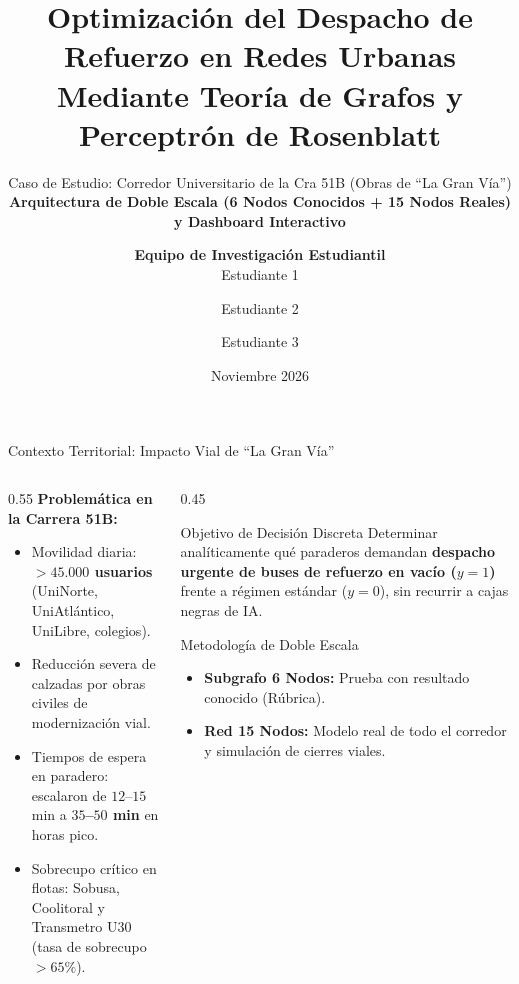 \documentclass[aspectratio=169,10pt]{beamer}
\title[\textbf{Grafos y Perceptrón en Cra 51B}]{\textbf{Optimización del Despacho de Refuerzo en Redes Urbanas Mediante Teoría de Grafos y Perceptrón de Rosenblatt}}
\subtitle{Caso de Estudio: Corredor Universitario de la Cra 51B (Obras de ``La Gran Vía'')\\
\small \textbf{Arquitectura de Doble Escala (6 Nodos Conocidos + 15 Nodos Reales) y Dashboard Interactivo}}
\author[\textbf{MAT 4021}]{\textbf{Equipo de Investigación Estudiantil}\\Estudiante 1 \and Estudiante 2 \and Estudiante 3}
\institute[UniNorte]{Departamento de Matemáticas y Estadística\\Universidad del Norte\\MAT 4021 - Matemáticas Discretas (MSc. Iván Gómez)}
\date{Noviembre 2026}
\begin{document}
\begin{frame}
    \titlepage
\end{frame}

\begin{frame}{Contexto Territorial: Impacto Vial de ``La Gran Vía''}
    \begin{columns}[T]
        \begin{column}{0.55\textwidth}
            \textbf{Problemática en la Carrera 51B:}
            \begin{itemize}
                \item Movilidad diaria: \textbf{$>45.000$ usuarios} (UniNorte, UniAtlántico, UniLibre, colegios).
                \item Reducción severa de calzadas por obras civiles de modernización vial.
                \item Tiempos de espera en paradero: escalaron de $12$--$15$ min a \textbf{$35$--$50$ min} en horas pico.
                \item Sobrecupo crítico en flotas: Sobusa, Coolitoral y Transmetro U30 (tasa de sobrecupo $>65\%$).
            \end{itemize}
        \end{column}
        \begin{column}{0.45\textwidth}
            \begin{block}{Objetivo de Decisión Discreta}
                Determinar analíticamente qué paraderos demandan \textbf{despacho urgente de buses de refuerzo en vacío ($y=1$)} frente a régimen estándar ($y=0$), sin recurrir a cajas negras de IA.
            \end{block}
            \vspace{0.2cm}
            \begin{exampleblock}{Metodología de Doble Escala}
                \begin{itemize}
                    \item \textbf{Subgrafo 6 Nodos:} Prueba con resultado conocido (Rúbrica).
                    \item \textbf{Red 15 Nodos:} Modelo real de todo el corredor y simulación de cierres viales.
                \end{itemize}
            \end{exampleblock}
        \end{column}
    \end{columns}
\end{frame}
\end{document}

